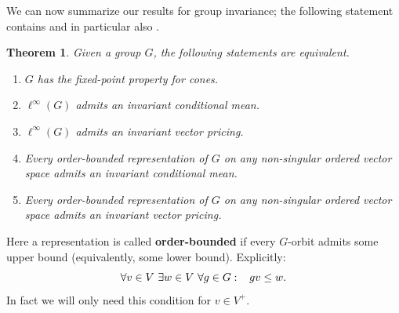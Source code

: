 \documentclass[11pt]{amsart}
\numberwithin{equation}{section}
\newtheorem{thm}{Theorem}[section]
\theoremstyle{definition}
\theoremstyle{definition}
\begin{document}
We can now summarize our results for group invariance; the following statement contains  and in particular also .

\begin{thm}\label{thm:FPC-abstract}
Given a group $G$, the following statements are equivalent.
\begin{enumerate}[label=\normalfont(\roman*)]
\item $G$ has the fixed-point property for cones.\label{pt:FPC-a:FPC}
\item $\ell^\infty(G)$ admits an invariant conditional mean. \label{pt:FPC-a:CM}
\item $\ell^\infty(G)$ admits an invariant vector pricing. \label{pt:FPC-a:VP}
\item Every order-bounded representation of $G$ on any non-singular ordered vector space admits an invariant conditional mean. \label{pt:FPC-a:CM-a}
\item Every order-bounded representation of $G$ on any non-singular ordered vector space admits an invariant vector pricing. \label{pt:FPC-a:VP-a}
\end{enumerate}
\end{thm}

Here a representation is called \textbf{order-bounded} if every $G$-orbit admits some upper bound (equivalently, some lower bound). Explicitly:
\begin{equation*}
\forall v\in V\ \exists w\in V \ \forall g\in G: \kern3mm g v \leq w.
\end{equation*}
In fact we will only need this condition for $v\in V^+$.
\end{document}
